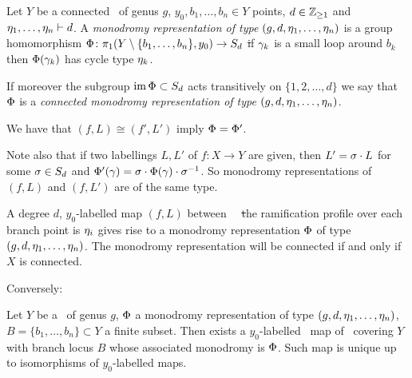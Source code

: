 \documentclass[10pt,handout]{beamer} %
\begin{document}

\begin{frame}

\begin{definition}
	Let $Y$ be a connected \rs\ of genus $g$, $y_0,b_1,\ldots,b_n\in Y$ points, $d\in\mathbb Z_{\geq1}$ and $\eta_1,\ldots,\eta_n\vdash d$. A \emph{monodromy representation of type} $(g,d,\eta_1,\ldots,\eta_n)$ is a group homomorphism $\Phi\colon\pi_1(Y\setminus\{b_1,\ldots,b_n\},y_0)\to S_d$ \st if $\gamma_k$ is a small loop around $b_k$ then $\Phi(\gamma_k)$ has cycle type $\eta_k$.
	
	If moreover the subgroup $\operatorname{im} \Phi\subset S_d$ acts transitively on $\{1,2,\ldots,d\}$ we say that $\Phi$ is a \emph{connected monodromy representation of type} $(g,d,\eta_1,\ldots,\eta_n)$.
	
\end{definition}
\pause
We have that $(f,L)\cong(f',L')$ imply $\Phi=\Phi'$.

Note also that if two labellings $L,L'$ of $f\colon X\to Y$ are given, then $L'=\sigma\cdot L$ for some $\sigma\in S_d$ and $\Phi'(\gamma)=\sigma\cdot\Phi(\gamma)\cdot\sigma^{-1}$. So monodromy representations of $(f,L)$ and $(f,L')$ are of the same type.

\end{frame}

\begin{frame}

A degree $d$, $y_0$-labelled map $(f,L)$ between \cpt\ \rss\ \st the ramification profile over each branch point is $\eta_i$ gives rise to a monodromy representation $\Phi$ of type $(g,d,\eta_1,\ldots,\eta_n)$. The monodromy representation will be connected if and only if $X$ is connected. 
\pause

Conversely:

\begin{theorem}
	Let $Y$ be a \rs\ of genus $g$, $\Phi$ a monodromy representation of type $(g,d,\eta_1,\ldots,\eta_n)$, $B=\{b_1,\ldots,b_n\}\subset Y$ a finite subset. Then exists a $y_0$-labelled \holo\ map of \rs\ covering $Y$ with branch locus $B$ whose associated monodromy is $\Phi$. Such map is unique up to isomorphisms of $y_0$-labelled maps. 
\end{theorem}

\end{frame}
\end{document}
